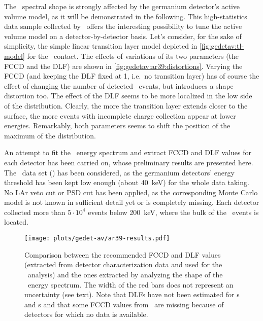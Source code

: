 The \Arl\ spectral shape is strongly affected by the germanium detector's active volume
model, as it will be demonstrated in the following. This high-statistics data sample
collected by \gerda\ offers the interesting possibility to tune the active volume model on
a detector-by-detector basis. Let's consider, for the sake of simplicity, the simple linear
transition layer model depicted in \cref{fig:gedetav:tl-model} for the \nplus\ contact.
The effects of variations of its two parameters (the FCCD and the DLF) are shown in
\cref{fig:gedetav:ar39:distortions}. Varying the FCCD (and keeping the DLF fixed at 1,
i.e.~no transition layer) has of course the effect of changing the number of detected
\Arl\ events, but introduces a shape distortion too. The effect of the DLF seems to be
more localized in the low side of the distribution. Clearly, the more the transition layer
extends closer to the surface, the more events with incomplete charge collection appear at
lower energies. Remarkably, both parameters seems to shift the position of the maximum of
the distribution.

An attempt to fit the \Arl\ energy spectrum and extract FCCD and DLF values for each
detector has been carried on, whose preliminary results are presented here. The
\phasetwop\ data set (\gexpophasetwopbkg) has been considered, as the germanium detectors' energy threshold has
been kept low enough (about 40~keV) for the whole data taking. No LAr veto cut or PSD cut
has been applied, as the corresponding Monte Carlo model is not known in sufficient detail
yet or is completely missing. Each detector collected more than $5 \cdot 10^4$ events
below 200~keV, where the bulk of the \Arl\ events is located. 
\newpar
{}

\begin{figure}
  \centering
  \texttt{[image: plots/gedet-av/ar39-results.pdf]}
  \caption{%
    Comparison between the recommended FCCD and DLF values (extracted from detector
    characterization data and used for the \onbb\ analysis) and the ones extracted by
    analyzing the shape of the \Arl\ energy spectrum. The width of the red bars does not
    represent an uncertainty (see text). Note that DLFs have not been estimated for
    \scoax{}s and \icoax{}s and that some FCCD values from \Arl\ are missing because of
    detectors for which no data is available.
  }\label{fig:gedetav:ar39-results}
\end{figure}


